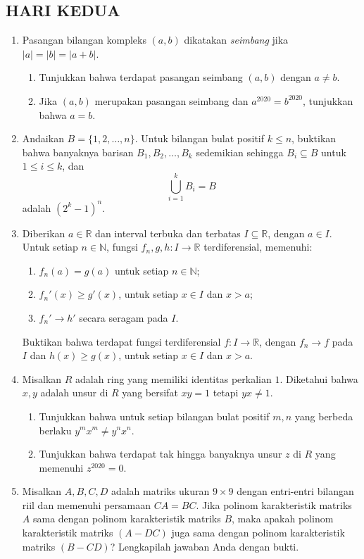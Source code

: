\documentclass[12pt,twoside]{article}
\begin{document}
\subsection{HARI KEDUA}
\begin{enumerate}
    \item Pasangan bilangan kompleks $(a,b)$ dikatakan \textit{seimbang} jika $|a| = |b| = |a + b|$.
          \begin{enumerate}
              \item Tunjukkan bahwa terdapat pasangan seimbang $(a,b)$ dengan $a \ne b$.
              \item Jika $(a,b)$ merupakan pasangan seimbang dan $a^{2020} = b^{2020}$, tunjukkan bahwa $a = b$.
          \end{enumerate}

    \item Andaikan $B = \{1, 2, \dots, n\}$. Untuk bilangan bulat positif $k \leq n$, buktikan bahwa banyaknya barisan $B_1, B_2, \dots, B_k$ sedemikian sehingga $B_i \subseteq B$ untuk $1 \leq i \leq k$, dan
          \[
              \bigcup_{i=1}^k B_i = B
          \]
          adalah $(2^k - 1)^n$.

    \item Diberikan $a \in \mathbb{R}$ dan interval terbuka dan terbatas $I \subseteq \mathbb{R}$, dengan $a \in I$. Untuk setiap $n \in \mathbb{N}$, fungsi $f_n, g, h : I \to \mathbb{R}$ terdiferensial, memenuhi:
          \begin{enumerate}
              \item $f_n(a) = g(a)$ untuk setiap $n \in \mathbb{N}$;
              \item $f_n'(x) \geq g'(x)$, untuk setiap $x \in I$ dan $x > a$;
              \item $f_n' \to h'$ secara seragam pada $I$.
          \end{enumerate}
          Buktikan bahwa terdapat fungsi terdiferensial $f : I \to \mathbb{R}$, dengan $f_n \to f$ pada $I$ dan $h(x) \geq g(x)$, untuk setiap $x \in I$ dan $x > a$.

    \item Misalkan $R$ adalah ring yang memiliki identitas perkalian $1$. Diketahui bahwa $x, y$ adalah unsur di $R$ yang bersifat $xy = 1$ tetapi $yx \ne 1$.
          \begin{enumerate}
              \item Tunjukkan bahwa untuk setiap bilangan bulat positif $m, n$ yang berbeda berlaku $y^m x^m \ne y^n x^n$.
              \item Tunjukkan bahwa terdapat tak hingga banyaknya unsur $z$ di $R$ yang memenuhi $z^{2020} = 0$.
          \end{enumerate}

    \item Misalkan $A, B, C, D$ adalah matriks ukuran $9 \times 9$ dengan entri-entri bilangan riil dan memenuhi persamaan $CA = BC$. Jika polinom karakteristik matriks $A$ sama dengan polinom karakteristik matriks $B$, maka apakah polinom karakteristik matriks $(A - DC)$ juga sama dengan polinom karakteristik matriks $(B - CD)$? Lengkapilah jawaban Anda dengan bukti.
\end{enumerate}
\end{document}
